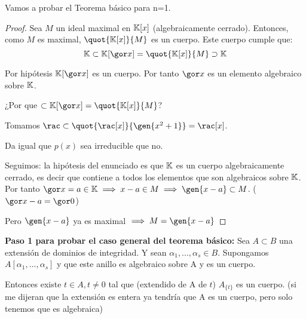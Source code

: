 Vamos a probar el Teorema básico para n=1.
\begin{proof}
	Sea $M$ un ideal maximal en $\mathbb{K}[x]$ (algebraicamente cerrado). Entonces, como $M$ es maximal, $\quot{\K[x]}{M}$ es un cuerpo. Este cuerpo cumple que:
	$$ \K  \subset \K[\cls{x}] = \quot{\K[x]}{M} \supset \K $$

	Por hipótesis $\K[\cls{x}]$ es un cuerpo. Por tanto $\cls{x}$ es un elemento algebraico sobre $\mathbb{K}$.

	¿Por que $\subset \K[\cls{x}] = \quot{\K[x]}{M}$?

	\begin{example}
		Tomamos $\rac \subset \quot{\rac[x]}{\gen{x^2+1}} = \rac[x]$.

		Da igual que $p(x)$ sea irreducible que no.
	\end{example}

	Seguimos: la hipótesis del enunciado es que $\mathbb{K}$ es un cuerpo algebraicamente cerrado, es decir que contiene a todos los elementos que son algebraicos sobre $\mathbb{K}$. Por tanto $\cls{x}=a \in \K \implies x-a \in M \implies \gen{x-a} \subset M$. ($\cls{x}-a = \cls{0}$)

	Pero $\gen{x-a}$ ya es maximal $\implies M = \gen{x-a}$
\end{proof}


\begin{prop}
	\textbf{Paso 1 para probar el caso general del teorema básico:}
	Sea $A \subset B$ una extensión de dominios de integridad. Y sean $\alpha_1,...,\alpha_s \in B$. Supongamos $A[\alpha_1,...,\alpha_s]$ y que este anillo es algebraico sobre A y es un cuerpo.

	Entonces existe $t \in A, t \neq 0$ tal que (extendido de A de $t$) $A_{\{t\}}$ es un cuerpo. (si me dijeran que la extensión es entera ya tendría que A es un cuerpo, pero solo tenemos que es algebraica)
\end{prop}


